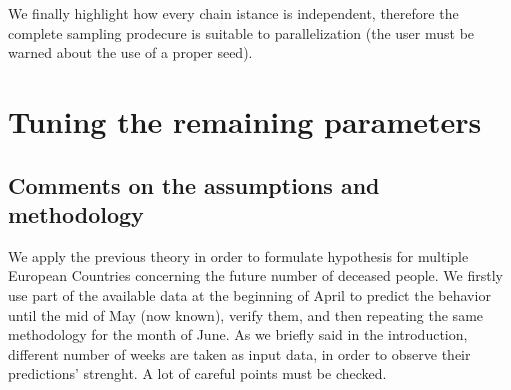 \documentclass[8pt]{article}
\begin{document}
We finally highlight how every chain istance
is independent, therefore the complete sampling prodecure 
is suitable to parallelization
(the user must be warned about the use of a proper seed).

\section{Tuning the remaining parameters}

\subsection{Comments on the assumptions and methodology}
We apply the previous theory in order to formulate hypothesis 
for multiple European Countries concerning the future number of
deceased people. We firstly use part of the available data at the beginning
of April to predict the behavior until the mid of May (now known),
verify them, and then
repeating the same methodology for the month of June.
As we briefly said in the introduction, different number of weeks
are taken as input data, in order to observe their predictions' strenght.
A lot of careful points must be checked.
\end{document}
